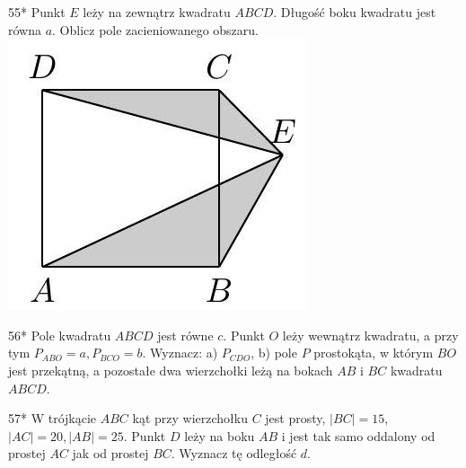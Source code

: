 \documentclass[10pt]{article}
\begin{document}
55* Punkt \(E\) leży na zewnątrz kwadratu \(A B C D\). Długość boku kwadratu jest równa \(a\). Oblicz pole zacieniowanego obszaru.\\
\includegraphics[max width=\textwidth, center]{2024_11_21_71f62bd117d375398909g-042(1)}

56* Pole kwadratu \(A B C D\) jest równe \(c\). Punkt \(O\) leży wewnątrz kwadratu, a przy tym \(P_{A B O}=a, P_{B C O}=b\). Wyznacz: a) \(P_{C D O}\), b) pole \(P\) prostokąta, w którym \(B O\) jest przekątną, a pozostałe dwa wierzchołki leżą na bokach \(A B\) i \(B C\) kwadratu \(A B C D\).

57* W trójkącie \(A B C\) kąt przy wierzchołku \(C\) jest prosty, \(|B C|=15\), \(|A C|=20,|A B|=25\). Punkt \(D\) leży na boku \(A B\) i jest tak samo oddalony od prostej \(A C\) jak od prostej \(B C\). Wyznacz tę odległość \(d\).
\end{document}
